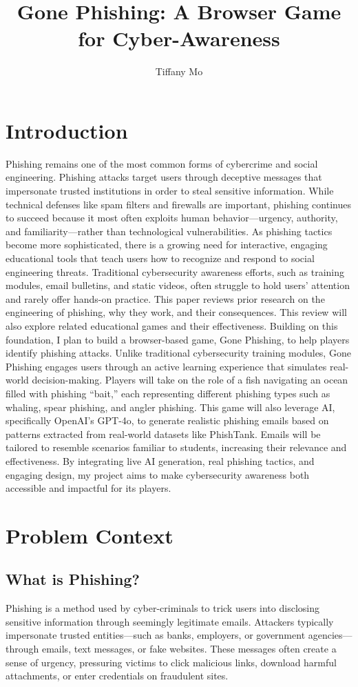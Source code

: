 \documentclass[10pt,twocolumn]{article}
\title{Gone Phishing: A Browser Game for Cyber-Awareness}
\author{Tiffany Mo}
\affiliation{Occidental College}
\begin{document}
\maketitle

\section{Introduction} 
Phishing remains one of the most common forms of cybercrime and social engineering. Phishing attacks target users through deceptive messages that impersonate trusted institutions in order to steal sensitive information. While technical defenses like spam filters and firewalls are important, phishing continues to succeed because it most often exploits human behavior—urgency, authority, and familiarity—rather than technological vulnerabilities. As phishing tactics become more sophisticated, there is a growing need for interactive, engaging educational tools that teach users how to recognize and respond to social engineering threats. Traditional cybersecurity awareness efforts, such as training modules, email bulletins, and static videos, often struggle to hold users' attention and rarely offer hands-on practice.
This paper reviews prior research on the engineering of phishing, why they work, and their consequences. This review will also explore related educational games and their effectiveness. Building on this foundation, I plan to build a browser-based game, Gone Phishing, to help players identify phishing attacks. Unlike traditional cybersecurity training modules, Gone Phishing engages users through an active learning experience that simulates real-world decision-making. Players will take on the role of a fish navigating an ocean filled with phishing “bait,” each representing different phishing types such as whaling, spear phishing, and angler phishing. This game will also leverage AI, specifically OpenAI’s GPT-4o, to generate realistic phishing emails based on patterns extracted from real-world datasets like PhishTank. Emails will be tailored to resemble scenarios familiar to students, increasing their relevance and effectiveness. By integrating live AI generation, real phishing tactics, and engaging design, my project aims to make cybersecurity awareness both accessible and impactful for its players.
\section{{Problem Context}}

\subsection{What is Phishing?}
Phishing is a method used by cyber-criminals to trick users into disclosing sensitive information through seemingly legitimate emails. \cite{comprehensive_review} Attackers typically impersonate trusted entities—such as banks, employers, or government agencies—through emails, text messages, or fake websites. These messages often create a sense of urgency, pressuring victims to click malicious links, download harmful attachments, or enter credentials on fraudulent sites.
\end{document}
